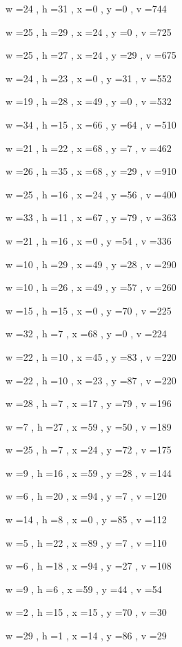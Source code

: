 \documentclass[11pt]{article}
\begin{document}
w =24 , h =31 , x =0 , y =0 , v =744
\par
w =25 , h =29 , x =24 , y =0 , v =725
\par
w =25 , h =27 , x =24 , y =29 , v =675
\par
w =24 , h =23 , x =0 , y =31 , v =552
\par
w =19 , h =28 , x =49 , y =0 , v =532
\par
w =34 , h =15 , x =66 , y =64 , v =510
\par
w =21 , h =22 , x =68 , y =7 , v =462
\par
w =26 , h =35 , x =68 , y =29 , v =910
\par
w =25 , h =16 , x =24 , y =56 , v =400
\par
w =33 , h =11 , x =67 , y =79 , v =363
\par
w =21 , h =16 , x =0 , y =54 , v =336
\par
w =10 , h =29 , x =49 , y =28 , v =290
\par
w =10 , h =26 , x =49 , y =57 , v =260
\par
w =15 , h =15 , x =0 , y =70 , v =225
\par
w =32 , h =7 , x =68 , y =0 , v =224
\par
w =22 , h =10 , x =45 , y =83 , v =220
\par
w =22 , h =10 , x =23 , y =87 , v =220
\par
w =28 , h =7 , x =17 , y =79 , v =196
\par
w =7 , h =27 , x =59 , y =50 , v =189
\par
w =25 , h =7 , x =24 , y =72 , v =175
\par
w =9 , h =16 , x =59 , y =28 , v =144
\par
w =6 , h =20 , x =94 , y =7 , v =120
\par
w =14 , h =8 , x =0 , y =85 , v =112
\par
w =5 , h =22 , x =89 , y =7 , v =110
\par
w =6 , h =18 , x =94 , y =27 , v =108
\par
w =9 , h =6 , x =59 , y =44 , v =54
\par
w =2 , h =15 , x =15 , y =70 , v =30
\par
w =29 , h =1 , x =14 , y =86 , v =29
\par
\newpage
\end{document}
